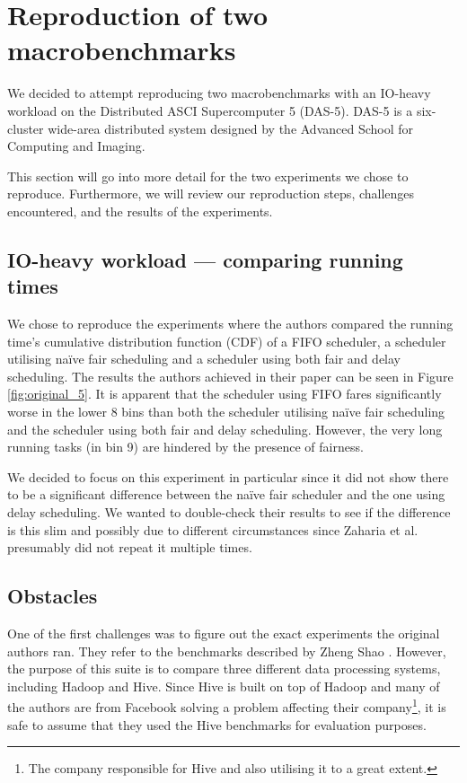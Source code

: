 \section{Reproduction of two macrobenchmarks}

We decided to attempt reproducing two macrobenchmarks with an IO-heavy workload on the Distributed ASCI Supercomputer 5 (DAS-5). DAS-5 is a six-cluster wide-area distributed system designed by the Advanced School for Computing and Imaging.

This section will go into more detail for the two experiments we chose to reproduce. Furthermore, we will review our reproduction steps, challenges encountered, and the results of the experiments.

\subsection{IO-heavy workload --- comparing running times}

We chose to reproduce the experiments where the authors compared the running time's cumulative distribution function (CDF) of a FIFO scheduler, a scheduler utilising na\"{i}ve fair scheduling and a scheduler using both fair and delay scheduling. The results the authors achieved in their paper can be seen in Figure \ref{fig:original_5}. It is apparent that the scheduler using FIFO fares significantly worse in the lower 8 bins than both the scheduler utilising na\"{i}ve fair scheduling and the scheduler using both fair and delay scheduling. However, the very long running tasks (in bin 9) are hindered by the presence of fairness.

We decided to focus on this experiment in particular since it did not show there to be a significant difference between the na\"{i}ve fair scheduler and the one using delay scheduling. We wanted to double-check their results to see if the difference is this slim and possibly due to different circumstances since Zaharia et al. presumably did not repeat it multiple times.



\subsection{Obstacles}

One of the first challenges was to figure out the exact experiments the original authors ran. They refer to the benchmarks described by Zheng Shao \cite{shao_2009}. However, the purpose of this suite is to compare three different data processing systems, including Hadoop and Hive. Since Hive is built on top of Hadoop and many of the authors are from Facebook solving a problem affecting their company\footnote{The company responsible for Hive and also utilising it to a great extent.}, it is safe to assume that they used the Hive benchmarks for evaluation purposes.

